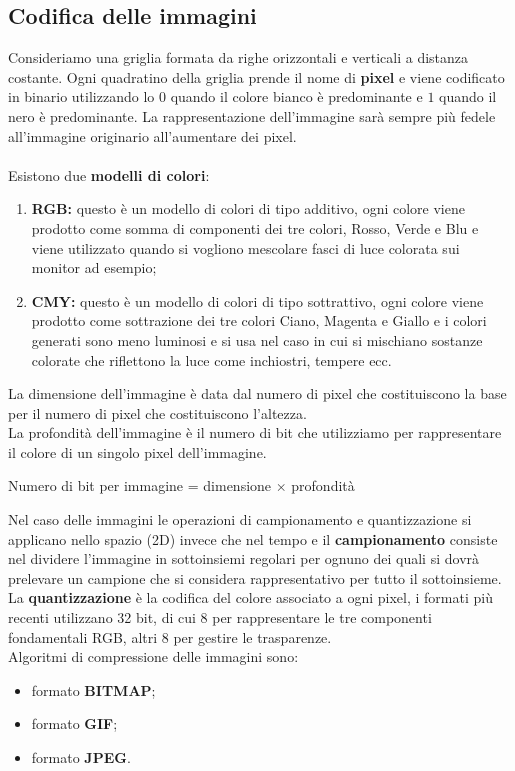\documentclass[12pt]{report}
\begin{document}
		\subsection{Codifica delle immagini}
		Consideriamo una griglia formata da righe orizzontali e verticali a distanza costante. Ogni quadratino della griglia prende il nome di \textbf{pixel} e viene codificato in binario utilizzando lo $0$ quando il colore bianco è predominante e $1$ quando il nero è predominante.
		La rappresentazione dell'immagine sarà sempre più fedele all'immagine originario all'aumentare dei pixel.
		\\
		\\
		Esistono due \textbf{modelli di colori}:
		\begin{enumerate}
			\item \textbf{RGB:} questo è un modello di colori di tipo additivo, ogni colore viene prodotto come somma di componenti dei tre colori, Rosso, Verde e Blu e viene utilizzato quando si vogliono mescolare fasci di luce colorata sui monitor ad esempio;
			\item \textbf{CMY:} questo è un modello di colori di tipo sottrattivo, ogni colore viene prodotto come sottrazione dei tre colori Ciano, Magenta e Giallo e i colori generati sono meno luminosi e si usa nel caso in cui si mischiano sostanze colorate che riflettono la luce come inchiostri, tempere ecc.
		\end{enumerate}
		La dimensione dell'immagine è data dal numero di pixel che costituiscono la base per il numero di pixel che costituiscono l'altezza.
		\\
		La profondità dell'immagine è il numero di bit che utilizziamo per rappresentare il colore di un singolo pixel dell'immagine.
		\begin{center}
			Numero di bit per immagine = dimensione $\times$ profondità
		\end{center}
		Nel caso delle immagini le operazioni di campionamento e quantizzazione si applicano nello spazio (2D) invece che nel tempo e il \textbf{campionamento} consiste nel dividere l'immagine in sottoinsiemi regolari per ognuno dei quali si dovrà prelevare un campione che si considera rappresentativo per tutto il sottoinsieme.
		\\
		La \textbf{quantizzazione} è la codifica del colore associato a ogni pixel, i formati più recenti utilizzano 32 bit, di cui 8 per rappresentare le tre componenti fondamentali RGB, altri 8 per gestire le trasparenze.
		\\
		Algoritmi di compressione delle immagini sono:
		\begin{itemize}
			\item formato \textbf{BITMAP};
			\item formato \textbf{GIF};
			\item formato \textbf{JPEG}.
		\end{itemize}
\end{document}
